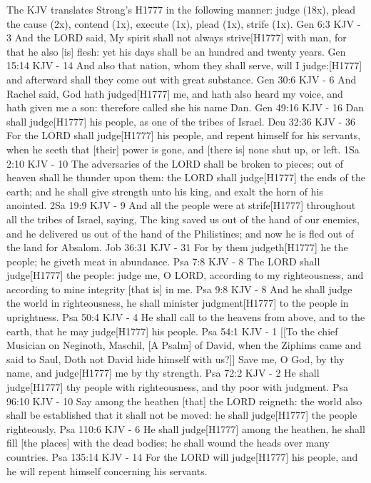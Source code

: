 \documentclass{book}
\begin{document}
The KJV translates Strong's H1777 in the following manner: judge (18x), plead the cause (2x), contend (1x), execute (1x), plead (1x), strife (1x).
Gen 6:3 KJV - 3 And the LORD said, My spirit shall not always strive[H1777] with man, for that he also [is] flesh: yet his days shall be an hundred and twenty years.
Gen 15:14 KJV - 14 And also that nation, whom they shall serve, will I judge:[H1777] and afterward shall they come out with great substance.
Gen 30:6 KJV - 6 And Rachel said, God hath judged[H1777] me, and hath also heard my voice, and hath given me a son: therefore called she his name Dan.
Gen 49:16 KJV - 16 Dan shall judge[H1777] his people, as one of the tribes of Israel.
Deu 32:36 KJV - 36 For the LORD shall judge[H1777] his people, and repent himself for his servants, when he seeth that [their] power is gone, and [there is] none shut up, or left.
1Sa 2:10 KJV - 10 The adversaries of the LORD shall be broken to pieces; out of heaven shall he thunder upon them: the LORD shall judge[H1777] the ends of the earth; and he shall give strength unto his king, and exalt the horn of his anointed.
2Sa 19:9 KJV - 9 And all the people were at strife[H1777] throughout all the tribes of Israel, saying, The king saved us out of the hand of our enemies, and he delivered us out of the hand of the Philistines; and now he is fled out of the land for Absalom.
Job 36:31 KJV - 31 For by them judgeth[H1777] he the people; he giveth meat in abundance.
Psa 7:8 KJV - 8 The LORD shall judge[H1777] the people: judge me, O LORD, according to my righteousness, and according to mine integrity [that is] in me.
Psa 9:8 KJV - 8 And he shall judge the world in righteousness, he shall minister judgment[H1777] to the people in uprightness.
Psa 50:4 KJV - 4 He shall call to the heavens from above, and to the earth, that he may judge[H1777] his people.
Psa 54:1 KJV - 1 [[To the chief Musician on Neginoth, Maschil, [A Psalm] of David, when the Ziphims came and said to Saul, Doth not David hide himself with us?]] Save me, O God, by thy name, and judge[H1777] me by thy strength.
Psa 72:2 KJV - 2 He shall judge[H1777] thy people with righteousness, and thy poor with judgment.
Psa 96:10 KJV - 10 Say among the heathen [that] the LORD reigneth: the world also shall be established that it shall not be moved: he shall judge[H1777] the people righteously.
Psa 110:6 KJV - 6 He shall judge[H1777] among the heathen, he shall fill [the places] with the dead bodies; he shall wound the heads over many countries.
Psa 135:14 KJV - 14 For the LORD will judge[H1777] his people, and he will repent himself concerning his servants.
\end{document}
